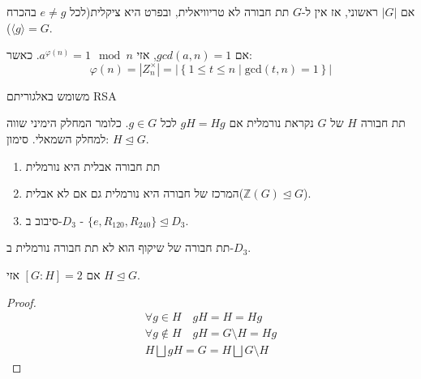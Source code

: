 \documentclass{tstextbook}
\begin{document}
\begin{corollary}
אם \(|G|\) ראשוני, אז אין ל-\(G\) תת חבורה לא טריוויאלית, ובפרט היא ציקלית(לכל \(e\neq g\) בהכרח \(\langle g\rangle=G\)).

\end{corollary}
\begin{theorem}[אוילר]
אם \(gcd(a,n)=1\), אזי \(a^{\varphi(n)}=1\mod n\). כאשר:
$$\varphi(n)=|Z_{n}^\times|=|\left\{  1\leq t\leq n \;\big|\;\mathrm{gcd}(t,n)=1  \right\}|$$

\end{theorem}
\begin{remark}
משומש באלגוריתם RSA

\end{remark}
\begin{definition}
תת חבורה \(H\) של \(G\) נקראת נורמלית אם \(gH=Hg\) לכל \(g \in G\). כלומר המחלק הימיני שווה למחלק השמאלי. 
סימון: \(H \trianglelefteq G\).

\end{definition}
\begin{example}
  \begin{enumerate}
    \item תת חבורה אבלית היא נורמלית 


    \item המרכז של חבורה היא נורמלית גם אם לא אבלית(\(\mathbb{Z}(G)\trianglelefteq G\)). 


    \item סיבוב ב-\(D_{3}\) - \(\{ e,R_{120},R_{240} \}\trianglelefteq D_{3}\). 


  \end{enumerate}
\end{example}
\begin{remark}
תת חבורה של שיקוף הוא לא תת חבורה נורמלית ב-\(D_{3}\).

\end{remark}
\begin{proposition}
אם \([G:H]=2\) אזי \(H\trianglelefteq G\). 

\end{proposition}
\begin{proof}
\begin{gather*}\forall g \in H\quad  gH=H=Hg\\\forall g\notin H\quad  gH=G\setminus H=Hg \\H \bigsqcup gH=G=H  \bigsqcup G \setminus H
\end{gather*}

\end{proof}
\end{document}
